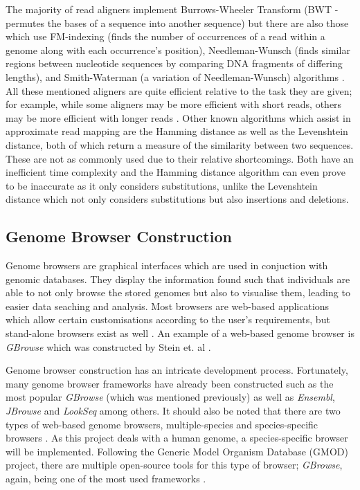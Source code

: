 \documentclass{csfyp}
\begin{document}
The majority of read aligners implement Burrows-Wheeler Transform (BWT - permutes the bases of a sequence into another sequence) but there are also those which use FM-indexing (finds the number of occurrences of a read within a genome along with each occurrence's position), Needleman-Wunsch (finds similar regions between nucleotide sequences by comparing DNA fragments of differing lengths), and Smith-Waterman (a variation of Needleman-Wunsch) algorithms \cite{bwtransform, popgen, cgreads}.  All these mentioned aligners are quite efficient relative to the task they are given; for example, while some aligners may be more efficient with short reads, others may be more efficient with longer reads \cite{companalys, compalign}.  Other known algorithms which assist in approximate read mapping are the Hamming distance as well as the Levenshtein distance, both of which return a measure of the similarity between two sequences.  These are not as commonly used due to their relative shortcomings.  Both have an inefficient time complexity and the Hamming distance algorithm can even prove to be inaccurate as it only considers substitutions, unlike the Levenshtein distance which not only considers substitutions but also insertions and deletions.  

\subsection{Genome Browser Construction}\vspace{-2ex}
Genome browsers are graphical interfaces which are used in conjuction with genomic databases.  They display the information found such that individuals are able to not only browse the stored genomes but also to visualise them, leading to easier data seaching and analysis.  Most browsers are web-based applications which allow certain customisations according to the user's requirements, but stand-alone browsers exist as well \cite{webbrowser, genericbrowser}.  An example of a web-based genome browser is {\textit{GBrowse}} which was constructed by Stein et. al \cite{genericbrowser}. 
 
Genome browser construction has an intricate development process.  Fortunately, many genome browser frameworks have already been constructed such as the most popular {\textit{GBrowse}} (which was mentioned previously) as well as {\textit{Ensembl}}, {\textit{JBrowse}} and {\textit{LookSeq}} among others.  It should also be noted that there are two types of web-based genome browsers, multiple-species and species-specific browsers \cite{webbrowser}.  As this project deals with a human genome, a species-specific browser will be implemented.  Following the Generic Model Organism Database (GMOD) project, there are multiple open-source tools for this type of browser; {\textit{GBrowse}}, again, being one of the most used frameworks \cite{webbrowser}.              
\end{document}
